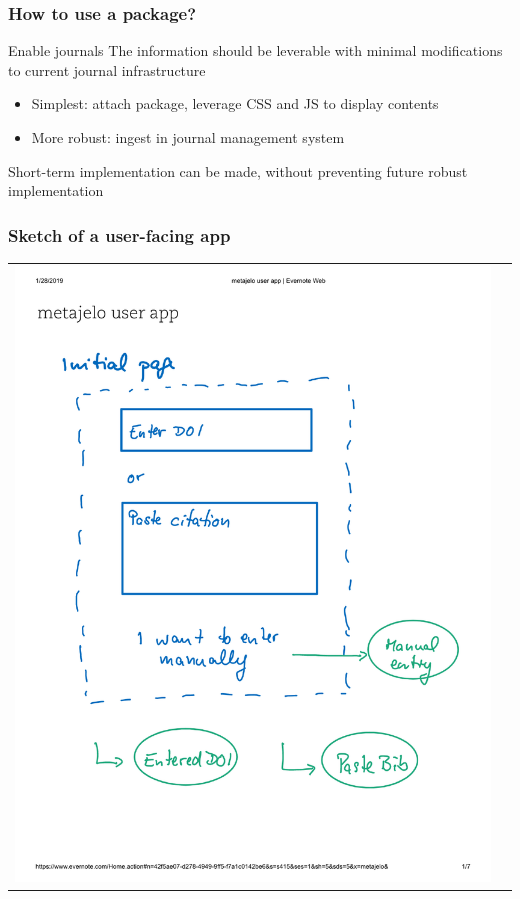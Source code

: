 \begin{frame}
\frametitle{How to \textbf{use} a \metajelo package?}
\begin{block}{Enable journals}
	The information should be leverable with minimal modifications to current journal infrastructure
	\begin{itemize}
		\item Simplest: attach \metajelo package, leverage CSS and JS to display contents
		\item More robust: ingest in journal management system
	\end{itemize}
Short-term implementation can be made, without preventing future robust implementation
\end{block}
\end{frame}

\begin{frame}
\frametitle{Sketch of a user-facing app}
\begin{tabular}{cc}
\includegraphics[page={1},height=0.7\paperheight]{images/metajelo-user-app-Evernote.pdf}

\end{tabular}
\end{frame}

